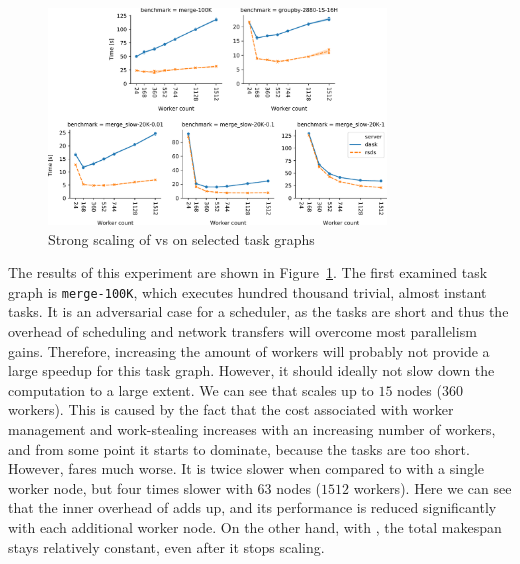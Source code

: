\begin{figure}[h]
	\centering
	\includegraphics[width=0.8\textwidth]{./imgs/rsds/charts/rsds-dask-scaling}
	\caption{Strong scaling of \rsds{} vs \dask{} on selected task graphs}
	\label{fig:rsds-dask-scaling}
\end{figure}

The results of this experiment are shown in Figure~\ref{fig:rsds-dask-scaling}. The first examined
task graph is \texttt{merge-100K}, which executes hundred thousand trivial, almost instant
tasks. It is an adversarial case for a scheduler, as the tasks are short and thus the overhead of
scheduling and network transfers will overcome most parallelism gains. Therefore, increasing the
amount of workers will probably not provide a large speedup for this task graph. However, it should
ideally not slow down the computation to a large extent. We can see that
\rsds{} scales up to $15$ nodes
($360$ workers). This is caused by the fact that the cost associated with
worker management and work-stealing increases with an increasing number of workers, and from some
point it starts to dominate, because the tasks are too short. However, \dask{}
fares much worse. It is twice slower when compared to \rsds{} with a single
worker node, but four times slower with $63$ nodes
($1512$ workers). Here we can see that the inner overhead of
\dask{} adds up, and its performance is reduced significantly with each
additional worker node. On the other hand, with \rsds{}, the total makespan
stays relatively constant, even after it stops scaling.

